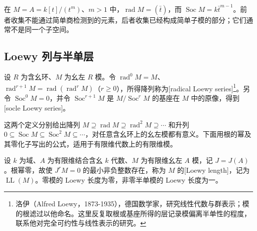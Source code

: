 在 \(M=A=k[t]/(t^m)\)、\(m>1\) 中，\(\operatorname{rad}M=(\bar t)\)，而 \(\operatorname{Soc}M=k\bar t^{m-1}\)。前者收集不能通过简单商检测到的元素，后者收集已经构成简单子模的部分；它们通常不是同一个子空间。

\subsection{Loewy 列与半单层}
\label{b2:subsec:1502:02}

\begin{definition}\label{b2:def:loewy-filtrations}
	设 \(R\) 为含幺环、\(M\) 为幺左 \(R\) 模。令 \(\operatorname{rad}^0M=M\)、\(\operatorname{rad}^{r+1}M=\operatorname{rad}(\operatorname{rad}^rM)\)（\(r\ge0\)），所得降列称为[radical Loewy series]\footnote{洛伊（Alfred Loewy，1873-1935），德国数学家，研究线性代数与群表示；模的根滤过以他命名。这里反复取根或基座所得的层记录模偏离半单性的程度，联系他对完全可约性与线性表示的研究。}。另令 \(\operatorname{Soc}^0M=0\)，并令 \(\operatorname{Soc}^{r+1}M\) 是 \(M/\operatorname{Soc}^rM\) 的基座在 \(M\) 中的原像，得到[socle Loewy series]。
\end{definition}

这两个定义分别给出降列 \(M\supseteq\operatorname{rad}M\supseteq\operatorname{rad}^2M\supseteq\cdots\) 和升列 \(0\subseteq\operatorname{Soc}M\subseteq\operatorname{Soc}^2M\subseteq\cdots\)，对任意含幺环上的幺左模都有意义。下面用根的幂及其零化子写出的公式，适用于有限维代数上的有限维模。

\ProseParagraphBreak
设 \(k\) 为域、\(A\) 为有限维结合含幺 \(k\) 代数、\(M\) 为有限维幺左 \(A\) 模，记 \(J=J(A)\)。根幂零，故使 \(J^rM=0\) 的最小非负整数存在，称为 \(M\) 的[Loewy length]，记为 \(\operatorname{LL}(M)\)。零模的 Loewy 长度为零，非零半单模的 Loewy 长度为一。

